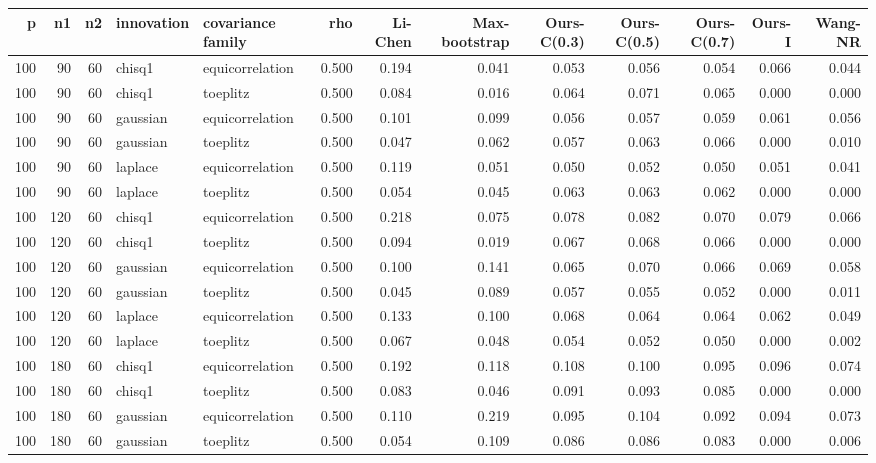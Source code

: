 \begin{tabular}{rrrllrrrrrrrr}
\toprule
p & n1 & n2 & innovation & covariance family & rho & Li-Chen & Max-bootstrap & Ours-C(0.3) & Ours-C(0.5) & Ours-C(0.7) & Ours-I & Wang-NR \\
\midrule
100 & 90 & 60 & chisq1 & equicorrelation & 0.500 & 0.194 & 0.041 & 0.053 & 0.056 & 0.054 & 0.066 & 0.044 \\
100 & 90 & 60 & chisq1 & toeplitz & 0.500 & 0.084 & 0.016 & 0.064 & 0.071 & 0.065 & 0.000 & 0.000 \\
100 & 90 & 60 & gaussian & equicorrelation & 0.500 & 0.101 & 0.099 & 0.056 & 0.057 & 0.059 & 0.061 & 0.056 \\
100 & 90 & 60 & gaussian & toeplitz & 0.500 & 0.047 & 0.062 & 0.057 & 0.063 & 0.066 & 0.000 & 0.010 \\
100 & 90 & 60 & laplace & equicorrelation & 0.500 & 0.119 & 0.051 & 0.050 & 0.052 & 0.050 & 0.051 & 0.041 \\
100 & 90 & 60 & laplace & toeplitz & 0.500 & 0.054 & 0.045 & 0.063 & 0.063 & 0.062 & 0.000 & 0.000 \\
100 & 120 & 60 & chisq1 & equicorrelation & 0.500 & 0.218 & 0.075 & 0.078 & 0.082 & 0.070 & 0.079 & 0.066 \\
100 & 120 & 60 & chisq1 & toeplitz & 0.500 & 0.094 & 0.019 & 0.067 & 0.068 & 0.066 & 0.000 & 0.000 \\
100 & 120 & 60 & gaussian & equicorrelation & 0.500 & 0.100 & 0.141 & 0.065 & 0.070 & 0.066 & 0.069 & 0.058 \\
100 & 120 & 60 & gaussian & toeplitz & 0.500 & 0.045 & 0.089 & 0.057 & 0.055 & 0.052 & 0.000 & 0.011 \\
100 & 120 & 60 & laplace & equicorrelation & 0.500 & 0.133 & 0.100 & 0.068 & 0.064 & 0.064 & 0.062 & 0.049 \\
100 & 120 & 60 & laplace & toeplitz & 0.500 & 0.067 & 0.048 & 0.054 & 0.052 & 0.050 & 0.000 & 0.002 \\
100 & 180 & 60 & chisq1 & equicorrelation & 0.500 & 0.192 & 0.118 & 0.108 & 0.100 & 0.095 & 0.096 & 0.074 \\
100 & 180 & 60 & chisq1 & toeplitz & 0.500 & 0.083 & 0.046 & 0.091 & 0.093 & 0.085 & 0.000 & 0.000 \\
100 & 180 & 60 & gaussian & equicorrelation & 0.500 & 0.110 & 0.219 & 0.095 & 0.104 & 0.092 & 0.094 & 0.073 \\
100 & 180 & 60 & gaussian & toeplitz & 0.500 & 0.054 & 0.109 & 0.086 & 0.086 & 0.083 & 0.000 & 0.006 \\

\end{tabular}
